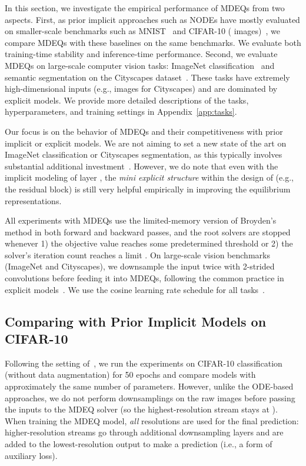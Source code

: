 \documentclass{article}
\begin{document}
In this section, we investigate the empirical performance of MDEQs from two aspects. First, as prior implicit approaches such as NODEs have mostly evaluated on smaller-scale benchmarks such as MNIST~\cite{LeCun1989} and CIFAR-10 ( images)~\cite{krizhevsky2009learning}, we compare MDEQs with these baselines on the same benchmarks. We evaluate both training-time stability and inference-time performance. Second, we evaluate MDEQs on large-scale computer vision tasks: ImageNet classification~\cite{deng2009imagenet} and semantic segmentation on the Cityscapes dataset~\cite{cordts2016cityscapes}. These tasks have extremely high-dimensional inputs (e.g.,  images for Cityscapes) and are dominated by explicit models. We provide more detailed descriptions of the tasks, hyperparameters, and training settings in Appendix~\ref{app:tasks}.

Our focus is on the behavior of MDEQs and their competitiveness with prior implicit or explicit models. We are not aiming to set a new state of the art on ImageNet classification or Cityscapes segmentation, as this typically involves substantial additional investment~\cite{xie2019self}. However, we do note that even with the implicit modeling of layer , the \emph{mini explicit structure} within the design of  (e.g., the residual block) is still very helpful empirically in improving the equilibrium representations.

All experiments with MDEQs use the limited-memory version of Broyden's method in both forward and backward passes, and the root solvers are stopped whenever 1) the objective value reaches some predetermined threshold  or 2) the solver's iteration count reaches a limit . On large-scale vision benchmarks (ImageNet and Cityscapes), we downsample the input twice with 2-strided convolutions before feeding it into MDEQs, following the common practice in explicit models~\cite{zhao2017pyramid,sun2019high}. We use the cosine learning rate schedule for all tasks~\cite{loshchilov2017sgdr}.

\subsection{Comparing with Prior Implicit Models on CIFAR-10}

Following the setting of~\citet{dupont2019augmented}, we run the experiments on CIFAR-10 classification (without data augmentation) for 50 epochs and compare models with approximately the same number of parameters. However, unlike the ODE-based approaches, we do not perform downsamplings on the raw images before passing the inputs to the MDEQ solver (so the highest-resolution stream stays at ). When training the MDEQ model, \emph{all} resolutions are used for the final prediction: higher-resolution streams go through additional downsampling layers and are added to the lowest-resolution output to make a prediction (i.e., a form of auxiliary loss).
\end{document}
